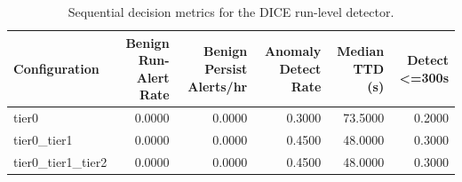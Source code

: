 \begin{table}[t]
\centering
\caption{Sequential decision metrics for the DICE run-level detector.}
\label{tab:dice_sequential_metrics}
\footnotesize
\begin{tabular}{lrrrrr}
\toprule
Configuration & Benign Run-Alert Rate & Benign Persist Alerts/hr & Anomaly Detect Rate & Median TTD (s) & Detect <=300s \\
\midrule
tier0 & 0.0000 & 0.0000 & 0.3000 & 73.5000 & 0.2000 \\
tier0_tier1 & 0.0000 & 0.0000 & 0.4500 & 48.0000 & 0.3000 \\
tier0_tier1_tier2 & 0.0000 & 0.0000 & 0.4500 & 48.0000 & 0.3000 \\
\bottomrule
\end{tabular}

\end{table}
